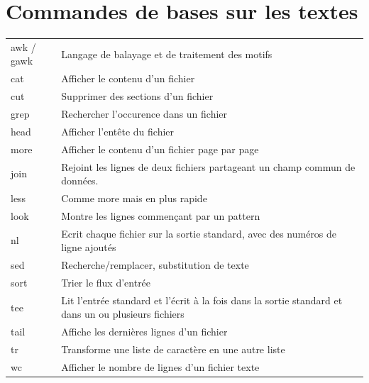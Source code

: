 \documentclass[a4paper, 11pt, french, oneside]{book}
\begin{document}
    	\section{Commandes de bases sur les textes}
	        \begin{tabular}{p{3cm}|p{11cm}}
				awk / gawk	& Langage de balayage et de traitement des motifs\\
				cat	& Afficher le contenu d’un fichier\\
				cut	& Supprimer des sections d’un fichier\\
				grep	& Rechercher l’occurence dans un fichier\\
				head	& Afficher l’entête du fichier\\
				more	& Afficher le contenu d’un fichier page par page\\
				join	& Rejoint les lignes de deux fichiers partageant un champ commun de données.\\
				less	& Comme more mais en plus rapide\\
				look	& Montre les lignes commençant par un pattern\\
				nl	& Ecrit chaque fichier sur la sortie standard, avec des numéros de ligne ajoutés\\
				sed	& Recherche/remplacer, substitution de texte\\
				sort	& Trier le flux d’entrée\\
				tee	& Lit l’entrée standard et l’écrit à la fois dans la sortie standard et dans un ou plusieurs fichiers\\
				tail	& Affiche les dernières lignes d’un fichier\\
				tr	& Transforme une liste de caractère en une autre liste\\
				wc	& Afficher le nombre de lignes d’un fichier texte\\
			\end{tabular}   
\end{document}
